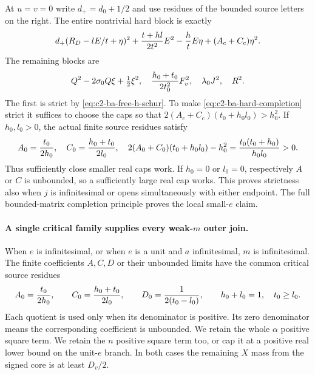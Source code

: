 At $u=v=0$ write $d_+=d_0+1/2$ and use residues of the bounded source
letters on the right. The entire nontrivial hard block is exactly
\begin{equation}
 d_+(R_D-lE/t+\eta)^2
 +{t+hl\over2t^2}E^2-{h\over t}E\eta+(A_c+C_c)\eta^2.
 \label{eq:c2-ba-hard-completion}
\end{equation}
The remaining blocks are
\[
 Q^2-2\sigma_0Q\xi+\tfrac12\xi^2,
 \quad {h_0+t_0\over2t_0^2}F_v^2,
 \quad \lambda_0J^2,\quad R^2.
\]
The first is strict by \eqref{eq:c2-ba-free-h-schur}. To make
\eqref{eq:c2-ba-hard-completion} strict it suffices to choose the caps
so that $2(A_c+C_c)(t_0+h_0l_0)>h_0^2$. If $h_0,l_0>0$, the actual
finite source residues satisfy
\[
 A_0={t_0\over2h_0},\quad C_0={h_0+t_0\over2l_0},\quad
 2(A_0+C_0)(t_0+h_0l_0)-h_0^2
 ={t_0(t_0+h_0)\over h_0l_0}>0.
\]
Thus sufficiently close smaller real caps work. If $h_0=0$ or
$l_0=0$, respectively $A$ or $C$ is unbounded, so a sufficiently large
real cap works. This proves strictness also when $j$ is infinitesimal
or opens simultaneously with either endpoint. The full bounded-matrix
completion principle proves the local small-$e$ claim.

\paragraph{A single critical family supplies every weak-$m$ outer join.}
When $e$ is infinitesimal, or when $e$ is a unit and $a$ infinitesimal,
$m$ is infinitesimal. The finite coefficients $A,C,D$ or their
unbounded limits have the common critical source residues
\begin{equation}
 A_0={t_0\over2h_0},\qquad C_0={h_0+t_0\over2l_0},\qquad
 D_0={1\over2(t_0-l_0)},\qquad h_0+l_0=1,\quad t_0\ge l_0.
 \label{eq:c2-ba-critical-family}
\end{equation}
Each quotient is used only when its denominator is positive. Its zero
denominator means the corresponding coefficient is unbounded. We retain
the whole $\alpha$ positive square term. We retain the $n$ positive square term too, or cap it at
a positive real lower bound on the unit-$e$ branch. In both cases the
remaining $X$ mass from the signed core is at least $D_v/2$.

